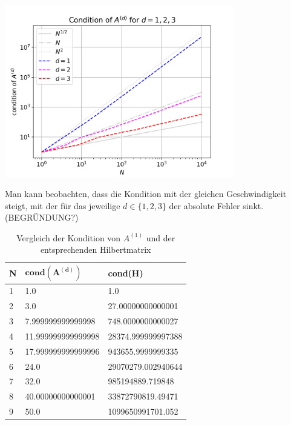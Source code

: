 \documentclass{scrartcl}
\begin{document}
{
  \centering
    \includegraphics[width=0.75\textwidth]{Grafiken/loglogcond_d123_neu}
    \vspace{-0.2cm}
}
\vspace{0.5cm}

Man kann beobachten, dass die Kondition mit der gleichen Geschwindigkeit steigt, mit der für das jeweilige $d \in \{ 1, 2, 3\}$ der absolute Fehler sinkt.
(BEGRÜNDUNG?)

\begin{table}[h!]
\centering
\begin{tabular}{|l|l|l|}
\hline
\textbf{N} & $\mathbf{cond(A^{(d)})}$ & \textbf{cond(H)}   \\ \hline
1          & 1.0                       & 1.0                \\ \hline
2          & 3.0                       & 27.00000000000001  \\ \hline
3          & 7.999999999999998         & 748.0000000000027  \\ \hline
4          & 11.999999999999998        & 28374.999999997388 \\ \hline
5          & 17.999999999999996        & 943655.9999999335  \\ \hline
6          & 24.0                      & 29070279.002940644 \\ \hline
7          & 32.0                      & 985194889.719848   \\ \hline
8          & 40.00000000000001         & 33872790819.49471  \\ \hline
9          & 50.0                      & 1099650991701.052  \\ \hline
\end{tabular}
\caption{Vergleich der Kondition von $A^{(1)}$ und der entsprechenden Hilbertmatrix}
\end{table}
\end{document}
